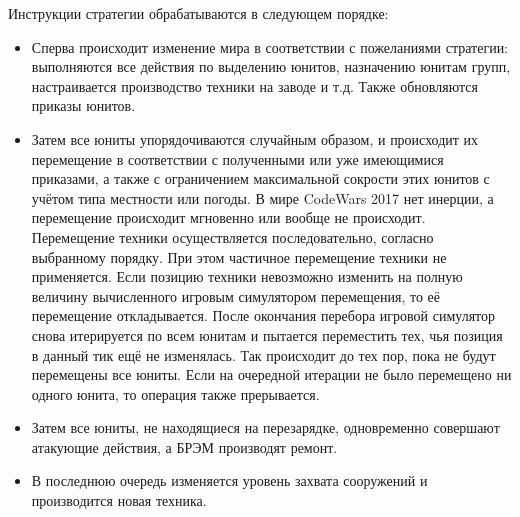Инструкции стратегии обрабатываются в следующем порядке:
\begin{itemize}
    \item Сперва происходит изменение мира в соответствии с пожеланиями стратегии: выполняются все действия по выделению юнитов, назначению
          юнитам групп, настраивается производство техники на заводе и т.д. Также обновляются приказы юнитов.
    \item Затем все юниты упорядочиваются случайным образом, и происходит их перемещение в соответствии с полученными или уже имеющимися
          приказами, а также с ограничением максимальной сокрости этих юнитов с учётом типа местности или погоды. В мире CodeWars 2017 нет
          инерции, а перемещение происходит мгновенно или вообще не происходит. Перемещение техники осуществляется последовательно, согласно
          выбранному порядку. При этом частичное перемещение техники не применяется. Если позицию техники невозможно изменить на полную
          величину вычисленного игровым симулятором перемещения\footnotemark[3], то её перемещение откладывается. После окончания перебора
          игровой симулятор снова итерируется по всем юнитам и пытается переместить тех, чья позиция в данный тик ещё не изменялась. Так
          происходит до тех пор, пока не будут перемещены все юниты. Если на очередной итерации не было перемещено ни одного юнита, то
          операция также прерывается.
    \item Затем все юниты, не находящиеся на перезарядке, одновременно совершают атакующие действия, а БРЭМ производят ремонт.
    \item В последнюю очередь изменяется уровень захвата сооружений и производится новая техника.
\end{itemize}



